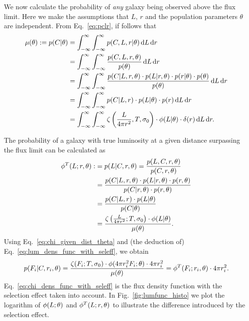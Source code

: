 We now calculate the probability of \textit{any} galaxy being observed above the flux limit.
Here we make the assumptions that $L$, $r$ and the population parameters $\theta$ are independent.
From Eq.~\ref{eq:pclr}, if follows that
\begin{align}
\mu(\theta):=p(C|\theta)
&=\int_{-\infty}^{\infty} \int_{-\infty}^{\infty} p(C, L, r | \theta)\, \mathrm{d}L \, \mathrm{d}r \\
&=\int_{-\infty}^{\infty} \int_{-\infty}^{\infty} \frac{p(C, L, r, \theta)}{p(\theta)} \, \mathrm{d}L \, \mathrm{d}r \\
&=\int_{-\infty}^{\infty} \int_{-\infty}^{\infty} \frac{p(C | L, r, \theta)\cdot p(L | r, \theta)\cdot p(r | \theta)\cdot p(\theta)}{p(\theta)}\, \mathrm{d}L \, \mathrm{d}r \\
&=\int_{-\infty}^{\infty} \int_{-\infty}^{\infty} p(C | L, r)\cdot p(L | \theta)\cdot p(r)\, \mathrm{d}L \, \mathrm{d}r \\
&=\int_{-\infty}^{\infty} \int_{-\infty}^{\infty} \zeta\left(\frac{L}{4\pi r^2},T,\sigma_{0}\right)\cdot\phi(L|\theta)\cdot \delta(r)\, \mathrm{d}L \, \mathrm{d}r.
\label{eq:mu}
\end{align}

The probability of a galaxy with true luminosity at a given distance surpassing the flux limit can be calculated as
\begin{align}
\phi^T(L ; r, \theta):&=p(L | C, r, \theta)
=\frac{p(L, C, r, \theta)}{p(C, r, \theta)} \\
&=\frac{p(C | L, r, \theta)\cdot p(L | r, \theta) \cdot p(r, \theta)}{p(C | r, \theta)\cdot p(r, \theta)} \\
&=\frac{p(C | L, r)\cdot p(L | \theta)}{p(C | \theta)} \\
&=\frac{\zeta\left(\frac{L}{4\pi r^2} ; T,\sigma_{0}\right)\cdot \phi(L | \theta)}{\mu(\theta)}.
\label{eq:lum_dens_func_with_seleff}
\end{align}
Using Eq.~\ref{eq:chi_given_dist_theta} and (the deduction of) Eq.~\ref{eq:lum_dens_func_with_seleff}, we obtain \begin{align}\label{eq:chi_dens_func_with_seleff} p(F_{i} | C, r_{i}, \theta) = \frac{\zeta(F_{i} ; T,\sigma_{0})\cdot \phi(4\pi r_{i}^2F_{i} ; \theta)\cdot 4\pi r_{i}^2}{\mu(\theta)}=\phi^{T}(F_{i} ; r_{i}, \theta)\cdot 4\pi r_{i}^{2}.
\end{align} Eq.~\ref{eq:chi_dens_func_with_seleff} is the flux density function with the selection effect taken into account.
In Fig.~\ref{fig:lumfunc_histo} we plot the logarithm of $\phi(L ; \theta)$ and $\phi^{T}(L ; r, \theta)$ to illustrate the difference introduced by the selection effect.

